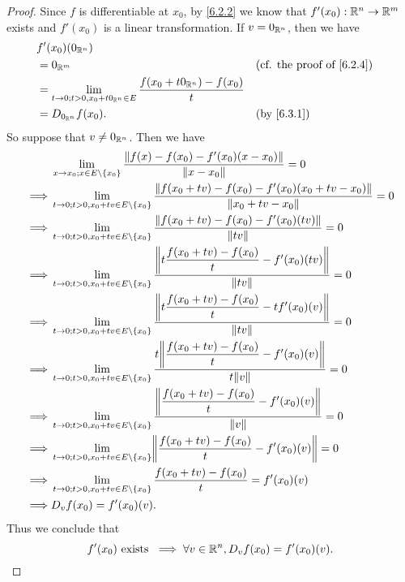 \begin{proof}
  Since \(f\) is differentiable at \(x_0\), by \cref{6.2.2} we know that \(f'(x_0) : \mathbb{R}^n \to \mathbb{R}^m\) exists and \(f'(x_0)\) is a linear transformation.
  If \(v = 0_{\mathbb{R}^n}\), then we have
  \begin{align*}
     & f'(x_0)(0_{\R^n})                                                                                                                    \\
     & = 0_{\R^m}                                                                               &  & \text{(cf. the proof of \cref{6.2.4})} \\
     & = \lim_{t \to 0 ; t > 0, x_0 + t 0_{\R^n} \in E} \dfrac{f(x_0 + t 0_{\R^n}) - f(x_0)}{t}                                             \\
     & = D_{0_{\R^n}} f(x_0).                                                                   &  & \by{6.3.1}
  \end{align*}
  So suppose that \(v \neq 0_{\mathbb{R}^n}\).
  Then we have
  \begin{align*}
             & \lim_{x \to x_0 ; x \in E \setminus \{x_0\}} \dfrac{\norm*{f(x) - f(x_0) - f'(x_0)(x - x_0)}}{\norm*{x - x_0}} = 0                                  \\
    \implies & \lim_{t \to 0 ; t > 0, x_0 + tv \in E \setminus \{x_0\}} \dfrac{\norm*{f(x_0 + tv) - f(x_0) - f'(x_0)(x_0 + tv - x_0)}}{\norm*{x_0 + tv - x_0}} = 0 \\
    \implies & \lim_{t \to 0 ; t > 0, x_0 + tv \in E \setminus \{x_0\}} \dfrac{\norm*{f(x_0 + tv) - f(x_0) - f'(x_0)(tv)}}{\norm*{tv}} = 0                         \\
    \implies & \lim_{t \to 0 ; t > 0, x_0 + tv \in E \setminus \{x_0\}} \dfrac{\norm*{t \dfrac{f(x_0 + tv) - f(x_0)}{t} - f'(x_0)(tv)}}{\norm*{tv}} = 0            \\
    \implies & \lim_{t \to 0 ; t > 0, x_0 + tv \in E \setminus \{x_0\}} \dfrac{\norm*{t \dfrac{f(x_0 + tv) - f(x_0)}{t} - t f'(x_0)(v)}}{\norm*{tv}} = 0           \\
    \implies & \lim_{t \to 0 ; t > 0, x_0 + tv \in E \setminus \{x_0\}} \dfrac{t \norm*{\dfrac{f(x_0 + tv) - f(x_0)}{t} - f'(x_0)(v)}}{t \norm*{v}} = 0            \\
    \implies & \lim_{t \to 0 ; t > 0, x_0 + tv \in E \setminus \{x_0\}} \dfrac{\norm*{\dfrac{f(x_0 + tv) - f(x_0)}{t} - f'(x_0)(v)}}{\norm*{v}} = 0                \\
    \implies & \lim_{t \to 0 ; t > 0, x_0 + tv \in E \setminus \{x_0\}} \norm*{\dfrac{f(x_0 + tv) - f(x_0)}{t} - f'(x_0)(v)} = 0                                   \\
    \implies & \lim_{t \to 0 ; t > 0, x_0 + tv \in E \setminus \{x_0\}} \dfrac{f(x_0 + tv) - f(x_0)}{t} = f'(x_0)(v)                                               \\
    \implies & D_v f(x_0) = f'(x_0)(v).
  \end{align*}
  Thus we conclude that
  \[
    f'(x_0) \text{ exists } \implies \forall v \in \mathbb{R}^n, D_v f(x_0) = f'(x_0)(v).
  \]
\end{proof}

